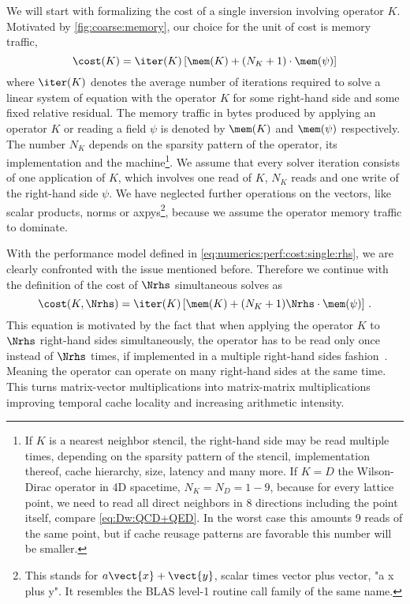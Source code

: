 We will start with formalizing the cost of a single inversion involving operator $K$.
Motivated by \cref{fig:coarse:memory}, our choice for the unit of cost is memory traffic,
\begin{equation} \label{eq:numerics:perf:cost:single:rhs}
\cost(K) = \iter(K) \left[ \mem(K) + (N_{K} + 1) \cdot \mem(\psi) \right]
\end{equation}
where $\iter(K)$ denotes the average number of iterations required to solve a linear system of equation with the operator $K$ for some right-hand side and some fixed relative residual.
The memory traffic in bytes produced by applying an operator $K$ or reading a field $\psi$ is denoted by $\mem(K)$ and $\mem(\psi)$ respectively.
The number $N_K$ depends on the sparsity pattern of the operator, its implementation and the machine\footnote{If $K$ is a nearest neighbor stencil, the right-hand side may be read multiple times, depending on the sparsity pattern of the stencil, implementation thereof, cache hierarchy, size, latency and many more. If $K=D$ the Wilson-Dirac operator in 4D spacetime, $N_K = N_D = 1-9$, because for every lattice point, we need to read all direct neighbors in \num{8} directions including the point itself, compare \cref{eq:Dw:QCD+QED}. In the worst case this amounts \num{9} reads of the same point, but if cache reusage patterns are favorable this number will be smaller.}.
We assume that every solver iteration consists of one application of $K$, which involves one read of $K$, $N_K$ reads and one write of the right-hand side $\psi$.
We have neglected further operations on the vectors, like scalar products, norms or axpys\footnote{This stands for $a \vect{x} + \vect{y}$, scalar times vector plus vector, "a x plus y". It resembles the BLAS level-1 routine call family of the same name.}, because we assume the operator memory traffic to dominate.

With the performance model defined in \cref{eq:numerics:perf:cost:single:rhs}, we are clearly confronted with the issue mentioned before.
Therefore we continue with the definition of the cost of $\Nrhs$ simultaneous solves as
\begin{equation}
\cost(K, \Nrhs) = \iter(K) \left[ \mem(K) + (N_{K} + 1) \Nrhs \cdot \mem(\psi) \right] \,.
\end{equation}
This equation is motivated by the fact that when applying the operator $K$ to $\Nrhs$ right-hand sides simultaneously, the operator has to be read only once instead of $\Nrhs$ times, if implemented in a multiple right-hand sides fashion~\cite{Boyle:2024pio}.
Meaning the operator can operate on many right-hand sides at the same time.
This turns matrix-vector multiplications into matrix-matrix multiplications improving temporal cache locality and increasing arithmetic intensity.

